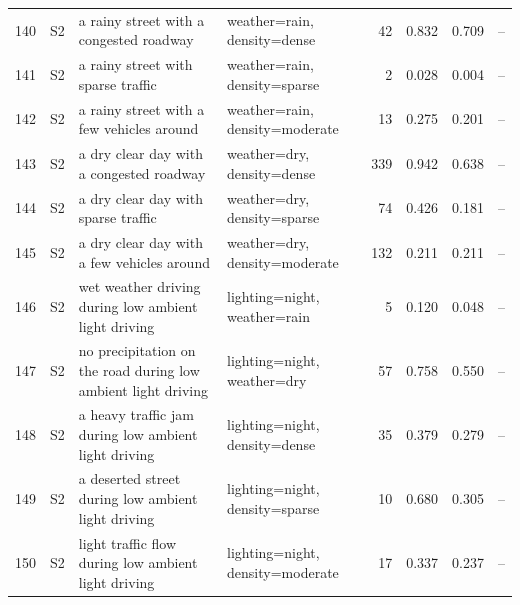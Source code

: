 \begin{longtable}{r l p{5.0cm} p{3.4cm} r r r r}
140 & S2 & a rainy street with a congested roadway & weather=rain, density=dense & 42 & 0.832 & 0.709 & --\\
141 & S2 & a rainy street with sparse traffic & weather=rain, density=sparse & 2 & 0.028 & 0.004 & --\\
142 & S2 & a rainy street with a few vehicles around & weather=rain, density=moderate & 13 & 0.275 & 0.201 & --\\
143 & S2 & a dry clear day with a congested roadway & weather=dry, density=dense & 339 & 0.942 & 0.638 & --\\
144 & S2 & a dry clear day with sparse traffic & weather=dry, density=sparse & 74 & 0.426 & 0.181 & --\\
145 & S2 & a dry clear day with a few vehicles around & weather=dry, density=moderate & 132 & 0.211 & 0.211 & --\\
146 & S2 & wet weather driving during low ambient light driving & lighting=night, weather=rain & 5 & 0.120 & 0.048 & --\\
147 & S2 & no precipitation on the road during low ambient light driving & lighting=night, weather=dry & 57 & 0.758 & 0.550 & --\\
148 & S2 & a heavy traffic jam during low ambient light driving & lighting=night, density=dense & 35 & 0.379 & 0.279 & --\\
149 & S2 & a deserted street during low ambient light driving & lighting=night, density=sparse & 10 & 0.680 & 0.305 & --\\
150 & S2 & light traffic flow during low ambient light driving & lighting=night, density=moderate & 17 & 0.337 & 0.237 & --\\
\end{longtable}
